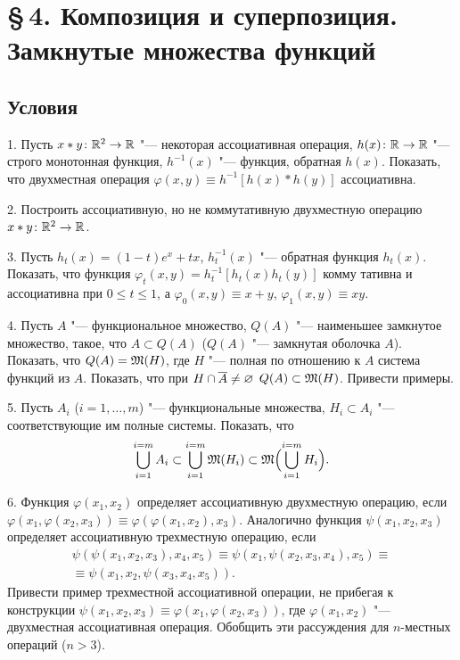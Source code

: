 \section*{\S\,4. Композиция и суперпозиция. Замкнутые множества функций}
\subsection*{Условия}
1. Пусть $x*y\colon\mathbb R^2\to\mathbb R$ "--- некоторая ассоциативная операция,
$h(x)\colon\mathbb R\to\mathbb R$ "--- строго монотонная функция, $h^{-1}(x)$ "---
функция, обратная $h(x)$. Показать, что двухместная операция
$\varphi(x,y)\equiv h^{-1}[h(x)*h(y)]$ ассоциативна.

2. Построить ассоциативную, но не коммутативную двухместную операцию
$x*y\colon\mathbb R^2\to\mathbb R$.

3. Пусть $h_t(x)=(1-t)e^x+tx$, $h_t^{-1}(x)$ "--- обратная функция
$h_t(x)$. Показать, что функция $\varphi_t(x,y)=h_t^{-1}[h_t(x)h_t(y)]$
комму\-%
тативна и ассоциативна при $0\le t\le1$, а $\varphi_0(x,y)\equiv x+y$,
$\varphi_1(x,y)\equiv xy$.

4. Пусть $A$ "--- функциональное множество, $Q(A)$ "--- наименьшее
замкнутое множество, такое, что $A\subset Q(A)$ ($Q(A)$ "--- замкнутая
оболочка $A$). Показать, что $Q(A)=\mathfrak M(H)$, где $H$ "--- полная по
отношению к $A$ система функций из $A$. Показать, что при
$H\cap\overline{A}\ne\varnothing$ $Q(A)\subset\mathfrak M(H)$. Привести примеры.

5. Пусть $A_i$ ($i=1,\dots,m$) "--- функциональные множества,
$H_i\subset A_i$ "--- соответствующие им полные системы. Показать, что
\[
\bigcup_{i=1}^{i=m}A_i\subset\bigcup_{i=1}^{i=m}\mathfrak M(H_i)\subset\mathfrak M\Bigl(\bigcup_{i=1}^{i=m}H_i\Bigr).
\]

6. Функция $\varphi(x_1,x_2)$ определяет ассоциативную двухместную
операцию, если $\varphi(x_1,\varphi(x_2,x_3))\equiv\varphi(\varphi(x_1,x_2),x_3)$.
Аналогично функция $\psi(x_1,x_2,x_3)$ определяет ассоциативную
трехместную операцию, если
\begin{multline*}
\psi(\psi(x_1,x_2,x_3),x_4,x_5)\equiv\psi(x_1,\psi(x_2,x_3,x_4),x_5)\equiv{}\\
\equiv\psi(x_1,x_2,\psi(x_3,x_4,x_5)).
\end{multline*}
Привести пример трехместной ассоциативной операции, не прибегая
к конструкции $\psi(x_1,x_2,x_3)\equiv\varphi(x_1,\varphi(x_2,x_3))$, где
$\varphi(x_1,x_2)$ "--- двухместная ассоциативная операция. Обобщить эти
рассуждения для $n$-местных операций ($n>3$).

